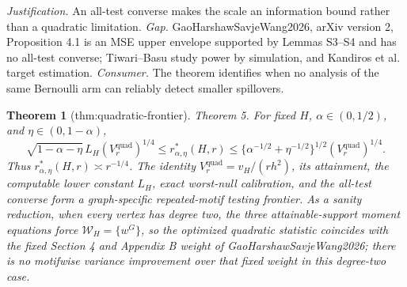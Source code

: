 \documentclass{article}
\newtheorem{theorem}{Theorem}
\begin{document}
\par\smallskip\noindent \textit{Justification.} An all-test converse makes the scale an information bound rather than a quadratic limitation. \textit{Gap.} GaoHarshawSavjeWang2026, arXiv version 2, Proposition 4.1 is an MSE upper envelope supported by Lemmas S3--S4 and has no all-test converse; Tiwari--Basu study power by simulation, and Kandiros et al. target estimation. \textit{Consumer.} The theorem identifies when no analysis of the same Bernoulli arm can reliably detect smaller spillovers.

\begin{theorem}[thm:quadratic-frontier]\label{thm:quadratic-frontier}
Theorem 5. For fixed \(H\), \(\alpha\in(0,1/2)\), and \(\eta\in(0,1-\alpha)\), \[\sqrt{1-\alpha-\eta}\,L_H(V^{\mathrm{quad}}_r)^{1/4}\le r^*_{\alpha,\eta}(H,r)\le\{\alpha^{-1/2}+\eta^{-1/2}\}^{1/2}(V^{\mathrm{quad}}_r)^{1/4}.\] Thus \(r^*_{\alpha,\eta}(H,r)\asymp r^{-1/4}\). The identity \(V^{\mathrm{quad}}_r=v_H/(rh^2)\), its attainment, the computable lower constant \(L_H\), exact worst-null calibration, and the all-test converse form a graph-specific repeated-motif testing frontier. As a sanity reduction, when every vertex has degree two, the three attainable-support moment equations force \(\mathcal W_H=\{w^G\}\), so the optimized quadratic statistic coincides with the fixed Section 4 and Appendix B weight of GaoHarshawSavjeWang2026; there is no motifwise variance improvement over that fixed weight in this degree-two case.
\end{theorem}
\end{document}
